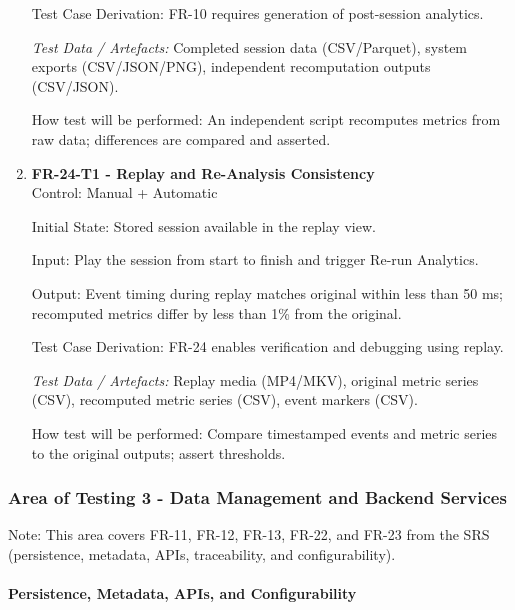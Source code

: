 \documentclass[12pt, titlepage]{article}
\begin{document}
\begin{enumerate}
Test Case Derivation: FR-10 requires generation of post-session analytics.

\textit{Test Data / Artefacts:} Completed session data (CSV/Parquet), system exports (CSV/JSON/PNG), independent recomputation outputs (CSV/JSON).

How test will be performed: An independent script recomputes metrics from raw data; differences are compared and asserted.

\item \textbf{FR-24-T1 - Replay and Re-Analysis Consistency} \\

Control: Manual + Automatic

Initial State: Stored session available in the replay view.

Input: Play the session from start to finish and trigger Re-run Analytics.

Output: Event timing during replay matches original within less than 50 ms; recomputed metrics differ by less than 1\% from the original.

Test Case Derivation: FR-24 enables verification and debugging using replay.

\textit{Test Data / Artefacts:} Replay media (MP4/MKV), original metric series (CSV), recomputed metric series (CSV), event markers (CSV).

How test will be performed: Compare timestamped events and metric series to the original outputs; assert thresholds.

\end{enumerate}


\subsubsection{Area of Testing 3 - Data Management and Backend Services}

Note: This area covers FR-11, FR-12, FR-13, FR-22, and FR-23 from the SRS (persistence, metadata, APIs, traceability, and configurability).

\paragraph{Persistence, Metadata, APIs, and Configurability}
\end{document}

